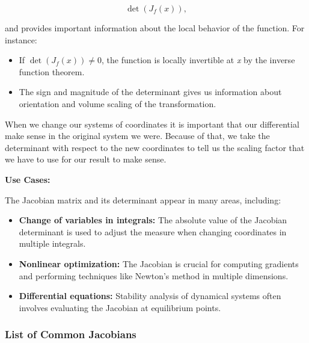 \[
    \det(J_{f}(x)),
\]

and provides important information about the local behavior of the function. For instance:

\begin{itemize}

    \item If \(\det(J_{f}(x)) \neq 0\), the function is locally invertible at \emph{x} by the inverse 
      function theorem.
  
      \item The sign and magnitude of the determinant 
      gives us information about orientation and volume scaling of the transformation.

\end{itemize}

When we change our systems of coordinates it is important that our differential make sense in the original 
system we were. Because of that, we take the determinant with respect to the new coordinates to tell us 
the scaling factor that we have to use for our result to make sense.
\vspace{\baselineskip}

\textbf{Use Cases:}
\vspace{\baselineskip}

The Jacobian matrix and its determinant appear in many areas, including:

\begin{itemize}
  
    \item \textbf{Change of variables in integrals:} The absolute value of the Jacobian determinant is 
          used to adjust the measure when changing coordinates in multiple integrals.
  
    \item \textbf{Nonlinear optimization:} The Jacobian is crucial for computing gradients and 
          performing techniques like Newton's method in multiple dimensions.
  
    \item \textbf{Differential equations:} Stability analysis of dynamical systems often involves 
          evaluating the Jacobian at equilibrium points.

\end{itemize}

\subsubsection{List of Common Jacobians}

